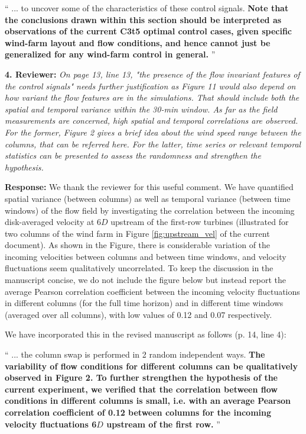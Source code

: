 \documentclass[]{article}
\begin{document}
`` 
... to uncover some of the characteristics of these control signals. \textbf{Note that the conclusions drawn within this section should be interpreted as observations of the current C3t5 optimal control cases, given specific wind-farm layout and flow conditions, and hence cannot just be generalized for any wind-farm control in general.}
''


\dotfill

\textbf{4. Reviewer: } \textit{On page 13, line 13, "the presence of the flow invariant features of the control signals"
	needs further justification as Figure 11 would also depend on how variant the flow
	features are in the simulations. That should include both the spatial and temporal
	variance within the 30-min window. As far as the field measurements are concerned,
	high spatial and temporal correlations are observed. For the former, Figure 2 gives a
	brief idea about the wind speed range between the columns, that can be referred here.
	For the latter, time series or relevant temporal statistics can be presented to assess the
	randomness and strengthen the hypothesis.}

\textbf{Response: } We thank the reviewer for this useful comment. We have quantified spatial variance (between columns) as well as temporal variance (between time windows) of the flow field by investigating the correlation between the incoming disk-averaged velocity at 6$D$ upstream of the first-row turbines (illustrated for two columns of the wind farm in Figure \ref{fig:upstream_vel} of the current document). As shown in the Figure, there is considerable variation of the incoming velocities between columns and between time windows, and velocity fluctuations seem qualitatively uncorrelated. To keep the discussion in the manuscript concise, we do not include the figure below but instead report the average Pearson correlation coefficient between the incoming velocity fluctuations in different columns (for the full time horizon) and in different time windows (averaged over all columns), with low values of 0.12 and 0.07 respectively. 

We have incorporated this in the revised manuscript as follows (p. 14, line 4): 

``
... the column swap is performed in 2 random independent ways. \textbf{The variability of flow conditions for different columns can be qualitatively observed in Figure 2. To further strengthen the hypothesis of the current experiment, we verified that the  correlation between flow conditions in different columns is small, i.e. with an average Pearson correlation coefficient of 0.12 between columns for the incoming velocity fluctuations 6$D$ upstream of the first row.}
''
\end{document}
